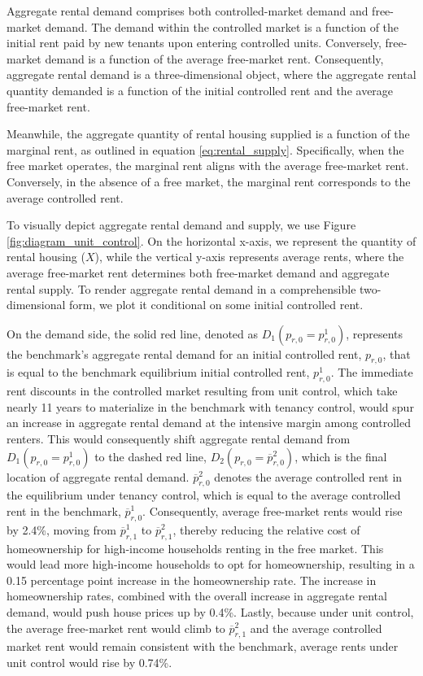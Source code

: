 \documentclass[parskip=full]{article}
\begin{document}
Aggregate rental demand comprises both controlled-market demand and free-market demand. The demand within the controlled market is a function of the initial rent paid by new tenants upon entering controlled units. Conversely, free-market demand is a function of the average free-market rent. Consequently, aggregate rental demand is a three-dimensional object, where the aggregate rental quantity demanded is a function of the initial controlled rent and the average free-market rent.

Meanwhile, the aggregate quantity of rental housing supplied is a function of the marginal rent, as outlined in equation \eqref{eq:rental_supply}. Specifically, when the free market operates, the marginal rent aligns with the average free-market rent. Conversely, in the absence of a free market, the marginal rent corresponds to the average controlled rent.

To visually depict aggregate rental demand and supply, we use Figure \ref{fig:diagram_unit_control}. On the horizontal x-axis, we represent the quantity of rental housing ($X$), while the vertical y-axis represents average rents, where the average free-market rent determines both free-market demand and aggregate rental supply. To render aggregate rental demand in a comprehensible two-dimensional form, we plot it conditional on some initial controlled rent.

On the demand side, the solid red line, denoted as $D_{1}(p_{r,0}=p^{1}_{r,0})$, represents the benchmark's aggregate rental demand for an initial controlled rent, $p_{r,0}$, that is equal to the benchmark equilibrium initial controlled rent, $p^{1}_{r,0}$. The immediate rent discounts in the controlled market resulting from unit control, which take nearly 11 years to materialize in the benchmark with tenancy control, would spur an increase in aggregate rental demand at the intensive margin among controlled renters. This would consequently shift aggregate rental demand from $D_{1}(p_{r,0}=p^{1}_{r,0})$ to the dashed red line, $D_{2}(p_{r,0}=\overline{p}^{2}_{r,0})$, which is the final location of aggregate rental demand. $\overline{p}^{2}_{r,0}$ denotes the average controlled rent in the equilibrium under tenancy control, which is equal to the average controlled rent in the benchmark, $\overline{p}^{1}_{r,0}$. Consequently, average free-market rents would rise by 2.4\%, moving from $\overline{p}^{1}_{r,1}$ to $\overline{p}^{2}_{r,1}$, thereby reducing the relative cost of homeownership for high-income households renting in the free market. This would lead more high-income households to opt for homeownership, resulting in a 0.15 percentage point increase in the homeownership rate. The increase in homeownership rates, combined with the overall increase in aggregate rental demand, would push house prices up by 0.4\%. Lastly, because under unit control, the average free-market rent would climb to $\overline{p}^{2}_{r,1}$ and the average controlled market rent would remain consistent with the benchmark, average rents under unit control would rise by 0.74\%.
\end{document}
